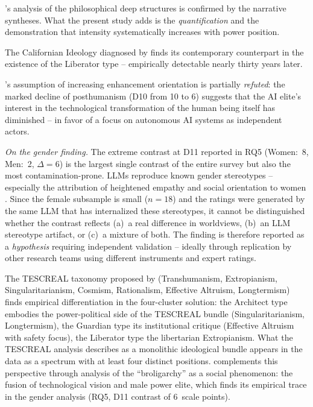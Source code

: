 \documentclass[12pt,a4paper]{article}
\begin{document}
\citeauthor{Daub2020}'s analysis of the philosophical deep structures is confirmed by the narrative syntheses. What the present study adds is the \emph{quantification} and the demonstration that intensity systematically increases with power position.

The Californian Ideology diagnosed by \citet{BarbCam1996} finds its contemporary counterpart in the existence of the Liberator type -- empirically detectable nearly thirty years later.

\citeauthor{Coeckelbergh2020}'s assumption of increasing enhancement orientation is partially \emph{refuted}: the marked decline of posthumanism (D10 from 10 to 6) suggests that the AI elite's interest in the technological transformation of the human being itself has diminished -- in favor of a focus on autonomous AI systems as independent actors.

\emph{On the gender finding.} The extreme contrast at D11 reported in RQ5 (Women:~8, Men:~2, $\Delta = 6$) is the largest single contrast of the entire survey but also the most contamination-prone. LLMs reproduce known gender stereotypes -- especially the attribution of heightened empathy and social orientation to women \citep{Santurkar2023}. Since the female subsample is small ($n = 18$) and the ratings were generated by the same LLM that has internalized these stereotypes, it cannot be distinguished whether the contrast reflects (a)~a real difference in worldviews, (b)~an LLM stereotype artifact, or (c)~a mixture of both. The finding is therefore reported as a \emph{hypothesis} requiring independent validation -- ideally through replication by other research teams using different instruments and expert ratings.

The TESCREAL taxonomy proposed by \citet{TorresGebru2024} (Transhumanism, Extropianism, Singularitarianism, Cosmism, Rationalism, Effective Altruism, Longtermism) finds empirical differentiation in the four-cluster solution: the Architect type embodies the power-political side of the TESCREAL bundle (Singularitarianism, Longtermism), the Guardian type its institutional critique (Effective Altruism with safety focus), the Liberator type the libertarian Extropianism. What the TESCREAL analysis describes as a monolithic ideological bundle appears in the data as a spectrum with at least four distinct positions. \citet{Becker2025} complements this perspective through analysis of the ``broligarchy'' as a social phenomenon: the fusion of technological vision and male power elite, which finds its empirical trace in the gender analysis (RQ5, D11 contrast of 6~scale points).
\end{document}
